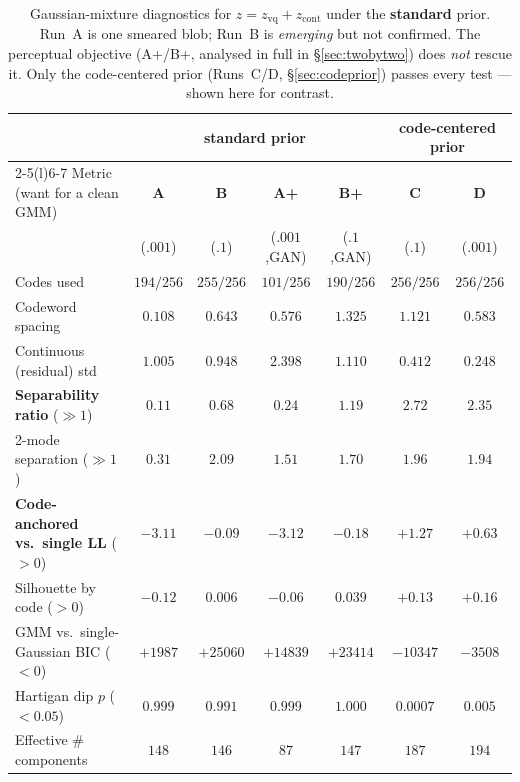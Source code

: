 \documentclass[11pt]{article}
\newcommand{\good}[1]{\textcolor{green!55!black}{#1}}
\newcommand{\bad}[1]{\textcolor{red!70!black}{#1}}
\begin{document}
\begin{table}[h]
\centering
\caption{Gaussian-mixture diagnostics for $z=z_{\text{vq}}+z_{\text{cont}}$ under the
\textbf{standard} prior. Run~A is one smeared blob; Run~B is \emph{emerging} but not confirmed.
The perceptual objective (A+/B+, analysed in full in \S\ref{sec:twobytwo}) does \emph{not}
rescue it. Only the code-centered prior (Runs~C/D, \S\ref{sec:codeprior}) passes every test
--- shown here for contrast.}
\label{tab:gmm}
\small
\setlength{\tabcolsep}{4pt}
\begin{tabular}{lcccccc}
\toprule
 & \multicolumn{4}{c}{standard prior} & \multicolumn{2}{c}{code-centered prior}\\
\cmidrule(r){2-5}\cmidrule(l){6-7}
Metric (want for a clean GMM) & \textbf{A} & \textbf{B} & \textbf{A+} & \textbf{B+} & \textbf{C} & \textbf{D}\\
 & ($.001$) & ($.1$) & ($.001$,GAN) & ($.1$,GAN) & ($.1$) & ($.001$)\\
\midrule
Codes used                       & $194/256$ & $255/256$ & \bad{$101/256$} & $190/256$ & \good{$256/256$} & \good{$256/256$}\\
Codeword spacing                 & $0.108$   & $0.643$   & $0.576$   & $1.325$   & $1.121$ & $0.583$\\
Continuous (residual) std        & $1.005$   & $0.948$   & $2.398$   & $1.110$   & $0.412$ & $0.248$\\
\textbf{Separability ratio} ($\gg 1$) & \bad{$0.11$} & $0.68$ & \bad{$0.24$} & $1.19$ & \good{$2.72$} & \good{$2.35$}\\
2-mode separation ($\gg 1$)      & \bad{$0.31$} & \good{$2.09$} & $1.51$ & $1.70$ & \good{$1.96$} & \good{$1.94$}\\
\textbf{Code-anchored vs.\ single LL} ($>0$) & \bad{$-3.11$} & $-0.09$ & \bad{$-3.12$} & \bad{$-0.18$} & \good{$+1.27$} & \good{$+0.63$}\\
Silhouette by code ($>0$)        & \bad{$-0.12$} & $0.006$ & \bad{$-0.06$} & $0.039$ & \good{$+0.13$} & \good{$+0.16$}\\
GMM vs.\ single-Gaussian BIC ($<0$) & \bad{$+1987$} & \bad{$+25060$} & \bad{$+14839$} & \bad{$+23414$} & \good{$-10347$} & \good{$-3508$}\\
Hartigan dip $p$ ($<0.05$)       & \bad{$0.999$} & \bad{$0.991$} & \bad{$0.999$} & \bad{$1.000$} & \good{$0.0007$} & \good{$0.005$}\\
Effective \# components          & $148$ & $146$ & $87$ & $147$ & $187$ & $194$\\
\bottomrule
\end{tabular}
\end{table}
\end{document}
